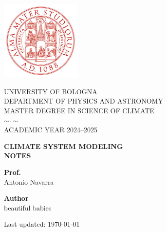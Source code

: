 \pagestyle{empty}


\titleformat{\section}[block]{\centering\bfseries\Large}{}{0pt}{}


\begin{titlepage}

	\setlength{\parindent}{0pt}

	\begin{center}
		\includegraphics[width=0.3\textwidth]{Impaginazione/logo_rosso} %
	\end{center}

	\begin{center}
		\Large UNIVERSITY OF BOLOGNA \\[0.5em]
		\large DEPARTMENT OF PHYSICS AND ASTRONOMY \\[0.5em]
		\large MASTER DEGREE IN SCIENCE OF CLIMATE \\[1em]
		$\sim \cdot \sim$ \\[1em]
		\large ACADEMIC YEAR 2024--2025
	\end{center}

	\vfill

	\begin{center}
		{\LARGE \textbf{CLIMATE SYSTEM MODELING}} \\[0.5em]
		{\LARGE \textbf{NOTES}}
	\end{center}

	\vfill

	\noindent
	\begin{minipage}[t]{0.48\textwidth}
		\raggedright
		\textbf{Prof.} \\
		Antonio Navarra
	\end{minipage}%
	\hfill
	\begin{minipage}[t]{0.48\textwidth}
		\raggedleft
		\textbf{Author} \\
		beautiful babies \\

	\end{minipage}


	\vfill

	\begin{center}
		Last updated:
		\today 
	\end{center}

	\restoregeometry

\end{titlepage}


\titleformat{\section}[block]{\normalfont\Large\bfseries}{\thesection}{1em}{}
